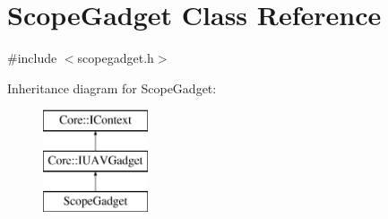 \hypertarget{class_scope_gadget}{\section{\-Scope\-Gadget \-Class \-Reference}
\label{class_scope_gadget}
}


{\ttfamily \#include $<$scopegadget.\-h$>$}

\-Inheritance diagram for \-Scope\-Gadget\-:\begin{figure}[H]
\begin{center}
\leavevmode
\includegraphics[height=3.000000cm]{class_scope_gadget}
\end{center}
\end{figure}
